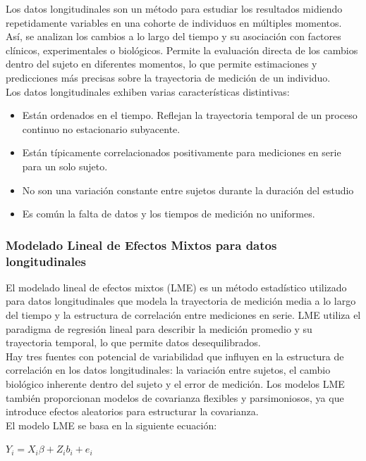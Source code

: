 \documentclass[12pt]{article}
\begin{document}
Los datos longitudinales son un método para estudiar los resultados midiendo repetidamente variables en una cohorte de individuos en múltiples momentos. Así, se analizan los cambios a lo largo del tiempo y su asociación con factores clínicos, experimentales o biológicos. Permite la evaluación directa de los cambios dentro del sujeto en diferentes momentos, lo que permite estimaciones y predicciones más precisas sobre la trayectoria de medición de un individuo.\\ Los datos longitudinales exhiben varias características distintivas:
\begin{itemize}
	\item Están ordenados en el tiempo. Reflejan la trayectoria temporal de un proceso continuo no estacionario subyacente.
	\item Están típicamente correlacionados positivamente para mediciones en serie para un solo sujeto.
	\item No son una variación constante entre sujetos durante la duración del estudio
	\item Es común la falta de datos y los tiempos de medición no uniformes.
\end{itemize}
 
\subsubsection{Modelado Lineal de Efectos Mixtos para datos longitudinales}

El modelado lineal de efectos mixtos (LME) es un método estadístico utilizado para datos longitudinales que modela la trayectoria de medición media a lo largo del tiempo y la estructura de correlación entre mediciones en serie. LME utiliza el paradigma de regresión lineal para describir la medición promedio y su trayectoria temporal, lo que permite datos desequilibrados.\\

Hay tres fuentes con potencial de variabilidad que influyen en la estructura de correlación en los datos longitudinales: la variación entre sujetos, el cambio biológico inherente dentro del sujeto y el error de medición. Los modelos LME también proporcionan modelos de covarianza flexibles y parsimoniosos, ya que introduce efectos aleatorios para estructurar la covarianza.\\

El modelo LME se basa en la siguiente ecuación:
\begin{center}
	$Y_{i} = X_{i}\beta + Z_{i}b_{i} + e_{i}$
\end{center}
\end{document}
